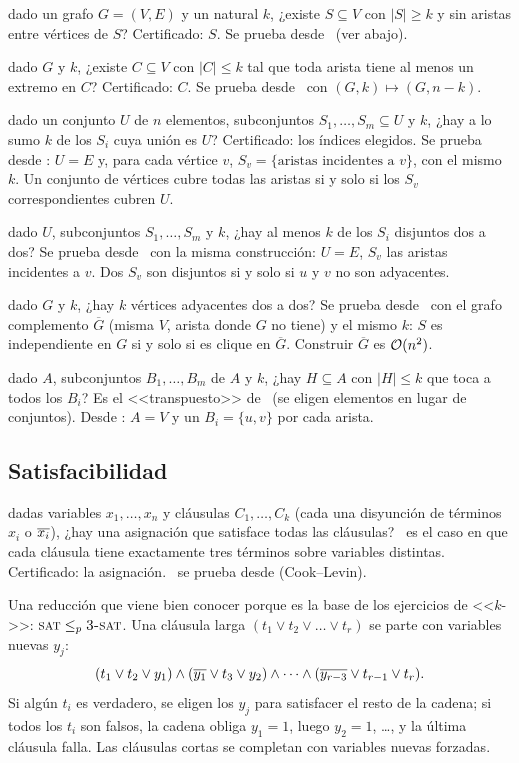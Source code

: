 \npdato{\npIS} dado un grafo $G=(V,E)$ y un natural $k$, ¿existe $S\subseteq V$ con $|S|\ge k$ y sin aristas entre vértices de $S$? Certificado: $S$. Se prueba desde \npTSAT\ (ver abajo).

\npdato{\npVC} dado $G$ y $k$, ¿existe $C\subseteq V$ con $|C|\le k$ tal que toda arista tiene al menos un extremo en $C$? Certificado: $C$. Se prueba desde \npIS\ con $(G,k)\mapsto(G,n-k)$.

\npdato{\npSC} dado un conjunto $U$ de $n$ elementos, subconjuntos $S_1,\dots,S_m\subseteq U$ y $k$, ¿hay a lo sumo $k$ de los $S_i$ cuya unión es $U$? Certificado: los índices elegidos. Se prueba desde \npVC: $U=E$ y, para cada vértice $v$, $S_v=\{\text{aristas incidentes a }v\}$, con el mismo $k$. Un conjunto de vértices cubre todas las aristas si y solo si los $S_v$ correspondientes cubren $U$.

\npdato{\npSP} dado $U$, subconjuntos $S_1,\dots,S_m$ y $k$, ¿hay al menos $k$ de los $S_i$ disjuntos dos a dos? Se prueba desde \npIS\ con la misma construcción: $U=E$, $S_v$ las aristas incidentes a $v$. Dos $S_v$ son disjuntos si y solo si $u$ y $v$ no son adyacentes.

\npdato{\npCL} dado $G$ y $k$, ¿hay $k$ vértices adyacentes dos a dos? Se prueba desde \npIS\ con el grafo complemento $\overline{G}$ (misma $V$, arista donde $G$ no tiene) y el mismo $k$: $S$ es independiente en $G$ si y solo si es clique en $\overline{G}$. Construir $\overline G$ es $\mathcal{O}(n^2)$.

 dado $A$, subconjuntos $B_1,\dots,B_m$ de $A$ y $k$, ¿hay $H\subseteq A$ con $|H|\le k$ que toca a todos los $B_i$? Es el <<transpuesto>> de \npSC\ (se eligen elementos en lugar de conjuntos). Desde \npVC: $A=V$ y un $B_i=\{u,v\}$ por cada arista.

\subsection{Satisfacibilidad}

\npdato{\npSAT} dadas variables $x_1,\dots,x_n$ y cláusulas $C_1,\dots,C_k$ (cada una disyunción de términos $x_i$ o $\overline{x_i}$), ¿hay una asignación que satisface todas las cláusulas? \npTSAT\ es el caso en que cada cláusula tiene exactamente tres términos sobre variables distintas. Certificado: la asignación. \npTSAT\ se prueba desde  (Cook--Levin).

Una reducción que viene bien conocer porque es la base de los ejercicios de <<$k$->>: $\textsc{sat}\le_{p}\textsc{3-sat}$. Una cláusula larga $(t_1\vee t_2\vee\dots\vee t_r)$ se parte con variables nuevas $y_j$:
\[
(t_1\vee t_2\vee y_1)\wedge(\overline{y_1}\vee t_3\vee y_2)\wedge\dots\wedge(\overline{y_{r-3}}\vee t_{r-1}\vee t_r).
\]
Si algún $t_i$ es verdadero, se eligen los $y_j$ para satisfacer el resto de la cadena; si todos los $t_i$ son falsos, la cadena obliga $y_1=1$, luego $y_2=1$, \dots, y la última cláusula falla. Las cláusulas cortas se completan con variables nuevas forzadas.

